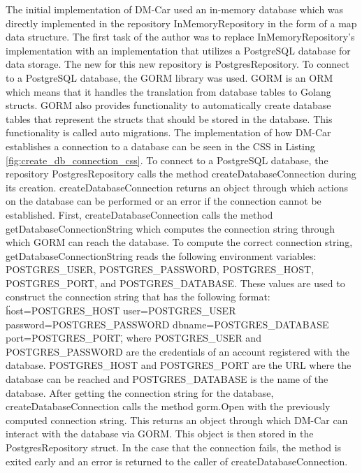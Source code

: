 The initial implementation of DM-Car used an in-memory database which was
directly implemented in the repository InMemoryRepository in the form of a map data structure. The
first task of the author was to replace InMemoryRepository's implementation with an
implementation that utilizes a PostgreSQL database for data storage.
The new for this new repository is PostgresRepository. To connect
to a PostgreSQL database, the GORM library was used. GORM is an ORM which means that it
handles the translation from database tables to Golang structs. GORM also provides
functionality to automatically create database tables that represent the structs that should
be stored in the database. This functionality is called auto migrations.
The implementation of how DM-Car establishes a connection to a database can be seen
in the CSS in Listing \ref{fig:create_db_connection_css}. To connect to a
PostgreSQL database, the repository PostgresRepository calls the method
createDatabaseConnection during its creation.
createDatabaseConnection returns an object through which actions on the database can be performed or an error if
the connection cannot be established. First, createDatabaseConnection calls the
method getDatabaseConnectionString which computes the connection string through which GORM
can reach the database. To compute the correct connection string, getDatabaseConnectionString reads the following
environment variables: POSTGRES\_USER, POSTGRES\_PASSWORD,
POSTGRES\_HOST, POSTGRES\_PORT, and POSTGRES\_DATABASE. These values are used to construct the connection string that has the following format:
\"host=POSTGRES\_HOST user=POSTGRES\_USER password=POSTGRES\_PASSWORD dbname=POSTGRES\_DATABASE port=POSTGRES\_PORT\",
where POSTGRES\_USER and POSTGRES\_PASSWORD are the credentials of an account registered with the database.
POSTGRES\_HOST and POSTGRES\_PORT are the URL where the database can be reached and POSTGRES\_DATABASE is the name of the database.
After getting the connection string for the database, createDatabaseConnection calls the method
gorm.Open with the previously computed connection string.
This returns an object through which DM-Car can interact with the database via GORM.
This object is then stored in the PostgresRepository struct.
In the case that the connection fails, the method is exited early and an error is returned to the
caller of createDatabaseConnection.

